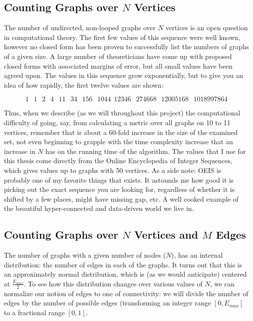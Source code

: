 \subsection{Counting Graphs over $N$ Vertices}

The number of undirected, non-looped graphs over $N$ vertices is an open question in computational theory.
The first few values of this sequence were well known, however no closed form has been proven to successfully list the numbers of graphs of a given size.
A large number of theoreticians have come up with proposed closed forms with associated margins of error, but all small values have been agreed upon.
The values in this sequence grow exponentially, but to give you an idea of how rapidly, the first twelve values are shown:

$$1\,\; \;1\, \;\;2\, \;\;4\, \;\;11\, \;\;34\, \;\;156\, \;\;1044\,\; 12346\,\;\; 274668\, \;\;12005168\, \;\;1018997864$$

Thus, when we describe (as we will throughout this project) the computational difficulty of going, say, from calculating a metric over all graphs on 10 to 11 vertices, remember that is about a 60-fold increase in the size of the examined set, not even beginning to grapple with the time complexity increase that an increase in $N$ has on the running time of the algorithm.
The values that I use for this thesis come directly from the Online Encyclopedia of Integer Sequences, which gives values up to graphs with 50 vertices.
As a side note: OEIS is probably one of my favorite things that exists.
It astounds me how good it is picking out the exact sequence you are looking for, regardless of whether it is shifted by a few places, might have missing gap, etc.
A well cooked example of the beautiful hyper-connected and data-driven world we live in.

\subsection{Counting Graphs over $N$ Vertices and $M$ Edges}

The number of graphs with a given number of nodes ($N$), has an internal distribution: the number of edges in each of the graphs.
It turns out that this is an approximately normal distribution, which is (as we would anticipate) centered at $\frac{E_{max}}{2}$. 
To see how this distribution changes over various values of $N$, we can normalize our notion of edges to one of connectivity:
we will divide the number of edges by the number of possible edges (transforming an integer range $[0, E_{max}]$ to a fractional range $[0, 1]$.

